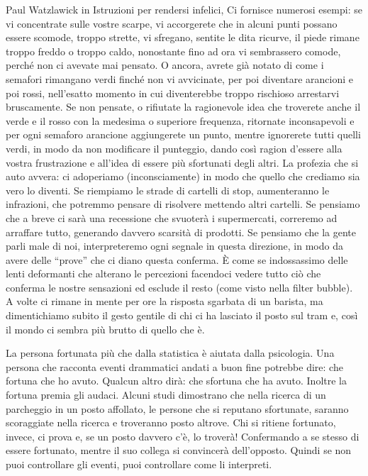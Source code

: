\documentclass[12pt]{book} %
\begin{document}
Paul Watzlawick in Istruzioni per rendersi
infelici, Ci fornisce
numerosi esempi: se vi concentrate sulle vostre scarpe, vi accorgerete che in alcuni punti possano essere scomode,
troppo strette, vi sfregano, sentite le dita ricurve, il piede rimane troppo freddo o troppo caldo, nonostante fino ad
ora vi sembrassero comode, perché non ci avevate mai pensato. O ancora, avrete già notato di come i semafori rimangano
verdi finché non vi avvicinate, per poi diventare arancioni e poi rossi, nell'esatto momento in
cui diventerebbe troppo rischioso arrestarvi bruscamente. Se non pensate, o rifiutate la ragionevole idea che troverete
anche il verde e il rosso con la medesima o superiore frequenza, ritornate inconsapevoli e per ogni semaforo arancione
aggiungerete un punto, mentre ignorerete tutti quelli verdi, in modo da non modificare il punteggio, dando così ragion
d'essere alla vostra frustrazione e all'idea di essere più sfortunati degli
altri. La profezia che si auto avvera: ci adoperiamo (inconsciamente) in modo che quello che crediamo sia vero lo
diventi. Se riempiamo le strade di cartelli di stop, aumenteranno le infrazioni, che potremmo pensare di risolvere
mettendo altri cartelli. Se pensiamo che a breve ci sarà una recessione che svuoterà i supermercati, correremo ad
arraffare tutto, generando davvero scarsità di prodotti. Se pensiamo che la gente parli male di noi, interpreteremo
ogni segnale in questa direzione, in modo da avere delle “prove” che ci diano questa conferma. È come se indossassimo
delle lenti deformanti che alterano le percezioni facendoci vedere tutto ciò che conferma le nostre sensazioni ed
esclude il resto (come visto nella filter bubble). A volte ci rimane in mente per ore la risposta sgarbata di un
barista, ma dimentichiamo subito il gesto gentile di chi ci ha lasciato il posto sul tram e, così il mondo ci sembra
più brutto di quello che è. \ 

La persona fortunata più che dalla statistica è aiutata dalla psicologia. Una persona che racconta eventi drammatici
andati a buon fine potrebbe dire: che fortuna che ho avuto. Qualcun altro dirà: che sfortuna che ha avuto. Inoltre la
fortuna premia gli audaci. Alcuni studi dimostrano che nella ricerca di un parcheggio in un posto affollato, le persone
che si reputano sfortunate, saranno scoraggiate nella ricerca e troveranno posto altrove. Chi si ritiene fortunato,
invece, ci prova e, se un posto davvero c'è, lo troverà! Confermando a se stesso di essere fortunato, mentre il suo
collega si convincerà dell'opposto. Quindi se non puoi controllare gli eventi, puoi controllare
come li interpreti.
\end{document}
